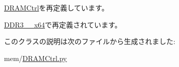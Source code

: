 \hyperlink{classDRAMCtrl_1_1DRAMCtrl_a7de8ac1f9497dea29b2aaab67a0fb1cc}{DRAMCtrl}を再定義しています。

\hyperlink{classDRAMCtrl_1_1DDR3__2133__x64_a94c112e585153e09e803751da3cfafcd}{DDR3\_\_\-x64}で再定義されています。

このクラスの説明は次のファイルから生成されました:\begin{DoxyCompactItemize}
\item 
mem/\hyperlink{DRAMCtrl_8py}{DRAMCtrl.py}\end{DoxyCompactItemize}
